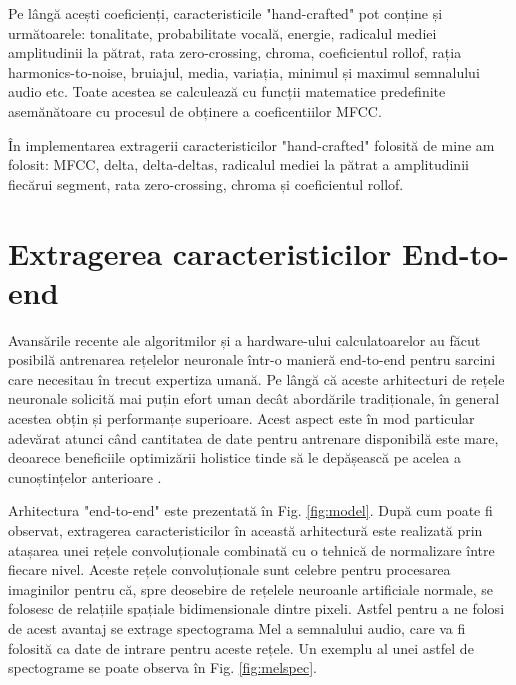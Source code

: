 \documentclass[a4paper,12pt]{book}
\begin{document}
				Pe lângă acești coeficienți, caracteristicile "hand-crafted" pot conține și următoarele: tonalitate, probabilitate vocală, energie,  radicalul mediei amplitudinii la pătrat, rata zero-crossing, chroma, coeficientul rollof, rația harmonics-to-noise, bruiajul, media, variația, minimul și maximul semnalului audio etc. Toate acestea se calculează cu funcții matematice predefinite asemănătoare cu procesul de obținere a coeficentiilor MFCC.			
				
				În implementarea extragerii caracteristicilor "hand-crafted" folosită de mine am folosit: MFCC, delta, delta-deltas, radicalul mediei la pătrat a amplitudinii fiecărui segment, rata zero-crossing, chroma și coeficientul rollof.
				
			\section{Extragerea caracteristicilor End-to-end}	\label{end-to-end}
			
			Avansările recente ale algoritmilor și a hardware-ului calculatoarelor au făcut posibilă antrenarea rețelelor neuronale într-o manieră end-to-end pentru sarcini care necesitau în trecut expertiza umană. Pe lângă că aceste arhitecturi de rețele neuronale solicită mai puțin efort uman decât abordările tradiționale, în general acestea obțin și performanțe superioare. Acest aspect este în mod particular adevărat atunci când cantitatea de date pentru antrenare disponibilă este mare, deoarece beneficiile optimizării holistice tinde să  le depășească pe acelea a cunoștințelor anterioare  \cite{graves}. \par
			
			Arhitectura "end-to-end" este prezentată în Fig. \ref{fig:model}. După cum poate fi observat, extragerea caracteristicilor în această  arhitectură este realizată prin atașarea unei rețele convoluționale combinată cu o tehnică de normalizare între fiecare nivel. Aceste rețele convoluționale sunt celebre pentru procesarea imaginilor pentru că, spre deosebire de rețelele neuroanle artificiale normale, se folosesc de relațiile spațiale bidimensionale dintre pixeli. Astfel pentru a ne folosi de acest avantaj se extrage spectograma Mel a semnalului audio, care va fi folosită ca date de intrare pentru aceste rețele. Un exemplu al unei astfel de spectograme se poate observa în Fig. \ref{fig:melspec}. \par
						
\end{document}
